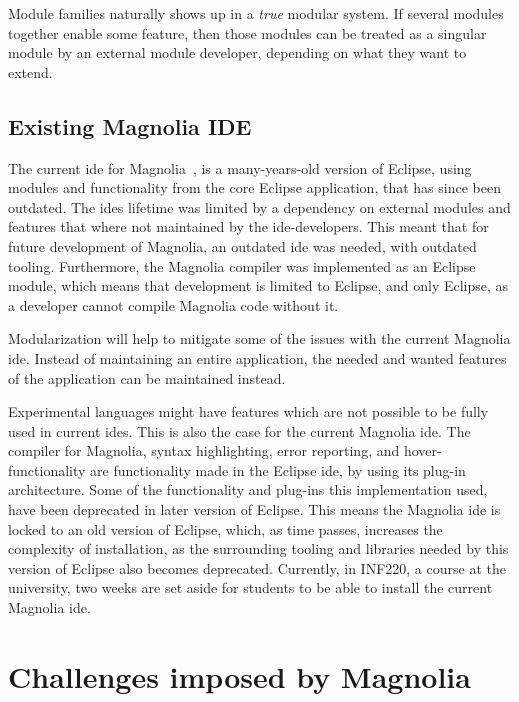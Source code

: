 Module families naturally shows up in a \textit{true} modular system. If
several modules together enable some feature, then those modules can be treated
as a singular module by an external module developer, depending on what they
want to extend.


\subsection{Existing Magnolia IDE}

The current \gls*{ide} for Magnolia~\cite{baggeIde}, is a many-years-old version
of Eclipse, using modules and functionality from the core Eclipse application,
that has since been outdated. The \gls*{ide}s lifetime was limited by a
dependency on external modules and features that where not maintained by the
\gls*{ide}-developers. This meant that for future development of Magnolia, an
outdated \gls*{ide} was needed, with outdated tooling. Furthermore, the Magnolia
compiler was implemented as an Eclipse module, which means that development is
limited to Eclipse, and only Eclipse, as a developer cannot compile Magnolia
code without it.

Modularization will help to mitigate some of the issues with the current
Magnolia \gls*{ide}. Instead of maintaining an entire application, the needed and
wanted features of the application can be maintained instead.

Experimental languages might have features which are not possible to be fully
used in current \gls*{ide}s. This is also the case for the current Magnolia
\gls*{ide}. The compiler for Magnolia, syntax highlighting, error reporting, and
hover-functionality are functionality made in the Eclipse \gls*{ide}, by using
its plug-in architecture. Some of the functionality and plug-ins this
implementation used, have been deprecated in later version of Eclipse. This
means the Magnolia \gls*{ide} is locked to an old version of Eclipse, which, as
time passes, increases the complexity of installation, as the surrounding
tooling and libraries needed by this version of Eclipse also becomes deprecated.
Currently, in INF220, a course at the university, two weeks are set aside for
students to be able to install the current Magnolia \gls*{ide}.


\section{Challenges imposed by Magnolia} \label{sec:challenges}

